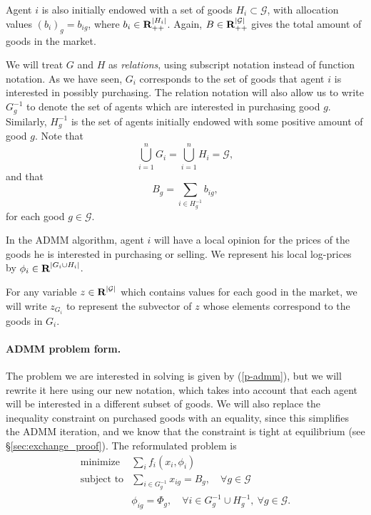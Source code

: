 \documentclass[12pt]{article}
\begin{document}
Agent $i$ is also initially endowed with a set of goods
$H_i \subset \mathcal{G}$,
with allocation values $(b_i)_g = b_{ig}$, where $b_i \in {\mbox{\bf R}}_{++}^{|H_i|}$.
Again, $B \in {\mbox{\bf R}}^{|\mathcal{G}|}_{++}$ gives the total amount of goods in
the market.


We will treat $G$ and $H$ as \emph{relations}, using subscript notation instead
of function notation. As we have seen, $G_i$ corresponds to the set of goods
that agent $i$ is interested in possibly purchasing. The relation notation will
also allow us to write $G^{-1}_g$ to denote the set of agents which are
interested in purchasing good $g$. Similarly, $H^{-1}_g$ is the set of agents
initially endowed with some positive amount of good $g$. Note that
\[
\bigcup_{i=1}^n G_i = \bigcup_{i=1}^n H_i = \mathcal{G},
\]
and that
\[
B_g = \sum\limits_{i \in H^{-1}_g} b_{ig},
\]
for each good $g \in \mathcal{G}$.

In the ADMM algorithm, agent $i$ will have a local opinion for the prices
of the goods he is interested in purchasing or selling.
We represent his local log-prices
by $\phi_i \in {\mbox{\bf R}}^{|G_i \cup H_i|}$.

For any variable $z \in {\mbox{\bf R}}^{|\mathcal{G}|}$ which contains values for
each good in the market, we will write $z_{G_i}$ to represent the subvector
of $z$ whose elements correspond to the goods in $G_i$.

\paragraph{ADMM problem form.}

The problem we are interested in solving is given by (\ref{p-admm}), but we
will rewrite it here using our new notation, which takes into account that each
agent will be interested in a different subset of goods. We will also replace
the inequality constraint on purchased goods with an equality, since this
simplifies the ADMM iteration, and we know that the constraint is tight at
equilibrium (see \S\ref{sec:exchange_proof}). The reformulated problem is
\begin{equation}
\begin{array}{ll}
\mbox{minimize} & \sum_i f_i(x_i, \phi_i) \\
\mbox{subject to} & \sum\limits_{i \in G^{-1}_g} x_{ig} = B_g,\quad \forall g \in \mathcal{G}\\
& \phi_{ig} = \Phi_g,\quad \forall i \in G^{-1}_g \cup H^{-1}_g,\ \forall g \in \mathcal{G}.
\end{array}
\label{p-admm2}
\end{equation}
\end{document}
